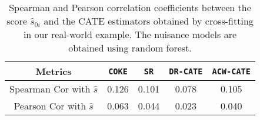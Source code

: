 \documentclass[12pt,a4paper,pdftex,onepage]{article}
\begin{document}
\begin{table}[htbp]
\centering
\begin{tabular}{|c|cccc|}
\hline Metrics & \texttt{COKE} & \texttt{SR} & \texttt{DR-CATE} & \texttt{ACW-CATE} \\
\hline Spearman Cor with $\hat{s}$ & 0.126 & 0.101 & 0.078 & 0.105 \\
\hline Pearson Cor with $\hat{s}$ & 0.063 & 0.044 & 0.023 & 0.040   \\ 
\hline
\end{tabular}
\caption{\label{tab:res:401:cross:rf} Spearman and Pearson correlation coefficients between the score $\hat{s}_{0i}$ and the CATE estimators obtained by cross-fitting in our real-world example. The nuisance models are obtained using random forest.}
\end{table}
\end{document}
